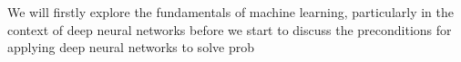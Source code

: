 We will firstly explore the fundamentals of machine learning, particularly in the context of deep neural networks before we start to discuss the preconditions for applying deep neural networks to solve prob